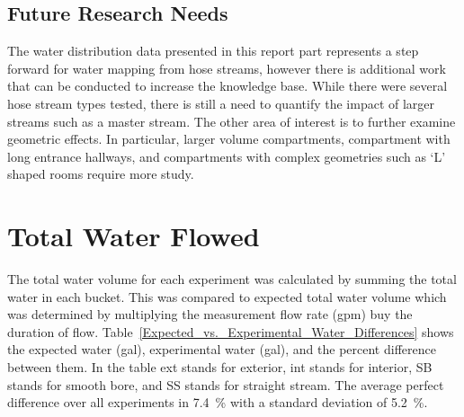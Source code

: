 \documentclass[12pt,oneside]{book}
\begin{document}
\section{Future Research Needs}
The water distribution data presented in this report part represents a step forward for water mapping from hose streams, however there is additional work that can be conducted to increase the knowledge base. While there were several hose stream types tested, there is still a need to quantify the impact of larger streams such as a master stream. The other area of interest is to further examine geometric effects. In particular, larger volume compartments, compartment with long entrance hallways, and compartments with complex geometries such as `L' shaped rooms require more study.




\appendix

\chapter{Total Water Flowed}
\label{app:Water_Volume}

The total water volume for each experiment was calculated by summing the total water in each bucket. This was compared to expected total water volume which was determined by multiplying the measurement flow rate (gpm) buy the duration of flow. Table~\ref{Expected_vs._Experimental_Water_Differences} shows the expected water (gal), experimental water (gal), and the percent difference between them. In the table ext stands for exterior, int stands for interior, SB stands for smooth bore, and SS stands for straight stream. The average perfect difference over all experiments in 7.4~\% with a standard deviation of 5.2~\%.
\end{document}
